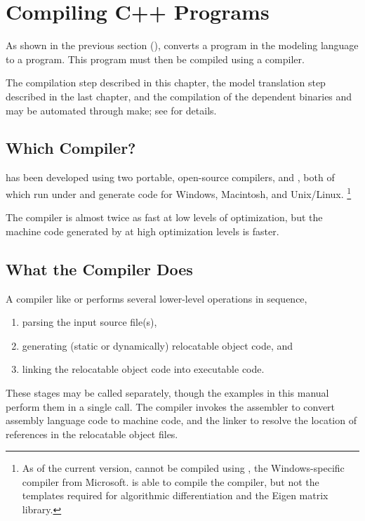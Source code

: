 \section{Compiling C++ Programs}\label{compiling-cpp.section}

\noindent
As shown in the previous section (), \Stan converts
a program in the \Stan modeling language to a \Cpp program.  This \Cpp
program must then be compiled using a \Cpp compiler.  

The \Cpp compilation step described in this chapter, the model
translation step described in the last chapter, and the compilation of
the dependent binaries  and  may
be automated through make; see  for details.

\subsection{Which Compiler?}

\Stan has been developed using two portable, open-source \Cpp
compilers, \gpp and \clang, both of which run under and generate code
for Windows, Macintosh, and Unix/Linux.%
%
\footnote{As of the current version, \Stan cannot be compiled using
  \MSVC, the Windows-specific compiler from Microsoft.  \MSVC is able
  to compile the  compiler, but not the templates required
  for algorithmic differentiation and the Eigen matrix library.}

The \clang compiler is almost twice as fast at low levels of
optimization, but the machine code generated by \gpp at high
optimization levels is faster.


\subsection{What the Compiler Does}

A \Cpp compiler like \gpp or \clang performs several lower-level
operations in sequence,
% 
\begin{enumerate}
\item
parsing the input \Cpp source file(s), 
\item 
generating (static or dynamically) relocatable object code, and
\item 
linking the relocatable object code into executable code.
\end{enumerate}
%
These stages may be called separately, though the examples in this
manual perform them in a single call.  The compiler invokes the
assembler to convert assembly language code to machine code, and the
linker to resolve the location of references in the relocatable object
files.

